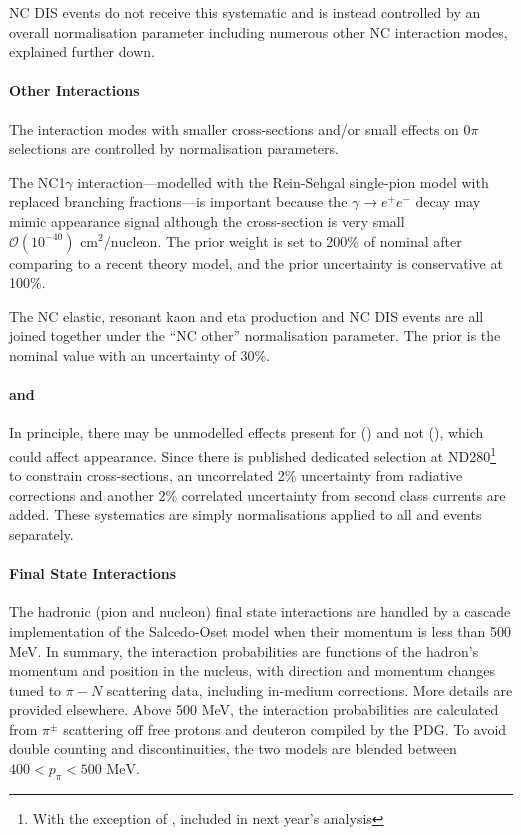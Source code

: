 NC DIS events do not receive this systematic and is instead controlled by an overall normalisation parameter including numerous other NC interaction modes, explained further down.

\paragraph{Other Interactions}
The interaction modes with smaller cross-sections and/or small effects on 0$\pi$ selections are controlled by normalisation parameters.

The NC1$\gamma$ interaction---modelled with the Rein-Sehgal single-pion model with replaced branching fractions---is important because the $\gamma \rightarrow e^+ e^-$ decay may mimic \nue appearance signal although the cross-section is very small $\mathcal{O}(10^{-40}) \text{ cm}^2/\text{nucleon}$\cite{thesis_pierre}. The prior weight is set to 200\% of nominal after comparing to a recent theory model\cite{nc1gamma}, and the prior uncertainty is conservative at 100\%.

The NC elastic, resonant kaon and eta production and NC DIS events are all joined together under the ``NC other'' normalisation parameter. The prior is the nominal value with an uncertainty of 30\%.

\paragraph{\nue and \nuebar}
In principle, there may be unmodelled effects present for \nue (\nuebar) and not \numu (\numubar), which could affect \nue appearance. Since there is published dedicated \nue selection at ND280\footnote{With the exception of \cite{thesis_pierre}, included in next year's analysis} to constrain \nue cross-sections, an uncorrelated 2\% uncertainty from radiative corrections and another 2\% correlated uncertainty from second class currents are added\cite{kevin_nue_numu}. These systematics are simply normalisations applied to all \nue and \nuebar events separately.

\paragraph{Final State Interactions}
The hadronic (pion and nucleon) final state interactions are handled by a cascade implementation of the Salcedo-Oset model \cite{salcedo_oset} when their momentum is less than 500 MeV. In summary, the interaction probabilities are functions of the hadron's momentum and position in the nucleus, with direction and momentum changes tuned to $\pi-N$ scattering data\cite{pion_scattering}, including in-medium corrections\cite{seki}. More details are provided elsewhere\cite{neut}. Above 500 MeV, the interaction probabilities are calculated from $\pi^\pm$ scattering off free protons and deuteron compiled by the PDG\cite{pdg_2010}. To avoid double counting and discontinuities, the two models are blended between $400 < p_\pi<500 \text{ MeV}$. 

